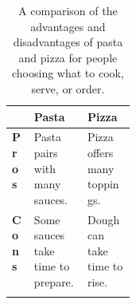 \documentclass{article}
\begin{document}
\begin{xltabular}{\linewidth}{p{0.185\linewidth}|X|X}
  & \textbf{Pasta} & \textbf{Pizza} \\
  \hline
  \textbf{Pros} & Pasta pairs with many sauces. & Pizza offers many toppings. \\
  \textbf{Cons} & Some sauces take time to prepare. & Dough can take time to rise. \\
  \caption{A comparison of the advantages and disadvantages of pasta and pizza for people choosing what to cook, serve, or order.} \\
\end{xltabular}
\end{document}

